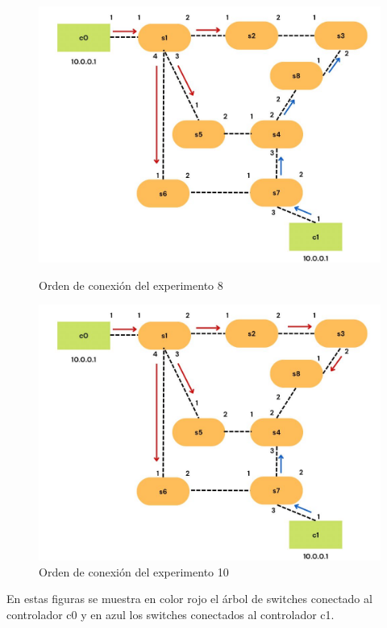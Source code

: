 \documentclass[a4paper, 12pt]{book}
\begin{document}
\begin{figure}[H]
 		\begin{minipage}[b]{0.35\textwidth}
 			\centering
 			\includegraphics[width=\textwidth]{img/escenario1_2c_7}
 			\caption{Orden de conexión del experimento 8}
 		\end{minipage}
 		\hfill
 		\begin{minipage}[b]{0.35\textwidth}
 			\centering
 			\includegraphics[width=\textwidth]{img/escenario1_2c_8}
 			\caption{Orden de conexión del experimento 10}
 			\label{figura:16}
 		\end{minipage}
 	\end{figure}
 	
	En estas figuras se muestra en color rojo el árbol de switches conectado al controlador c0 y en azul los switches conectados al controlador c1.
 	
\end{document}
